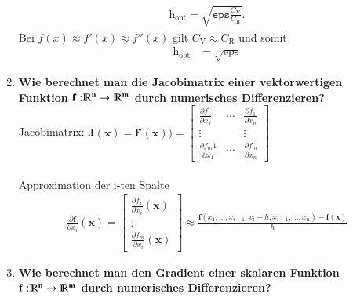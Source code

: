 \begin{enumerate}
			\begin{align*}
				\text{h}_\text{opt}=\sqrt{\texttt{eps}\frac{C_\text{V}}{C_\text{R}}}.
			\end{align*}			 
			Bei \(f(x)\approx f'(x) \approx f''(x)\) gilt \(C_\text{V} \approx C_\text{R}\) und somit
			\begin{align*}
				\text{h}_\text{opt}&=\sqrt{\text{eps}}
			\end{align*}
		\item \textbf{Wie berechnet man die Jacobimatrix einer vektorwertigen Funktion \(\mathbf{f:}{\rm I\!R}\mathbf{^n} \rightarrow {\rm I\!R}\mathbf{^m}\) durch numerisches Differenzieren?}\\
			Jacobimatrix: \(\mathbf{J(x)}=\mathbf{f'(x)})=\begin{bmatrix}
				\frac{\partial f_1}{\partial x_1} & \cdots & \frac{\partial f_1}{\partial x_n} \\
				\vdots &  & \vdots \\
				\frac{\partial f_m1}{\partial x_1} & \cdots & \frac{\partial f_m}{\partial x_n}
			\end{bmatrix}\) \\\\
			Approximation der i-ten Spalte
			\begin{align*}
				\frac{\partial \mathbf{f}}{\partial x_i}(\mathbf{x})=
					\begin{bmatrix}
						\frac{\partial f_1}{\partial x_i}(\mathbf{x}) \\
						\vdots \\
						\frac{\partial f_m}{\partial x_i}(\mathbf{x})
					\end{bmatrix}
					\approx \frac{\mathbf{f}(x_1,\dots,x_{i-1},x_i+h,x_{i+1},\dots,x_n)-\mathbf{f(x)}}{h}
			\end{align*}
		\item \textbf{Wie berechnet man den Gradient einer skalaren Funktion \(\mathbf{f:}{\rm I\!R}\mathbf{^n} \rightarrow {\rm I\!R}\mathbf{^m}\) durch numerisches Differenzieren?}\\
	\end{enumerate}